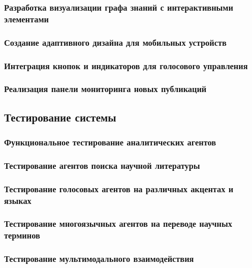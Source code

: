 \documentclass{syksu-coursework}
\begin{document}
\subsubsection{Разработка визуализации графа знаний с интерактивными элементами}

\subsubsection{Создание адаптивного дизайна для мобильных устройств}

\subsubsection{Интеграция кнопок и индикаторов для голосового управления}

\subsubsection{Реализация панели мониторинга новых публикаций}

\subsection{Тестирование системы}

\subsubsection{Функциональное тестирование аналитических агентов}

\subsubsection{Тестирование агентов поиска научной литературы}

\subsubsection{Тестирование голосовых агентов на различных акцентах и языках}

\subsubsection{Тестирование многоязычных агентов на переводе научных терминов}

\subsubsection{Тестирование мультимодального взаимодействия}
\end{document}
